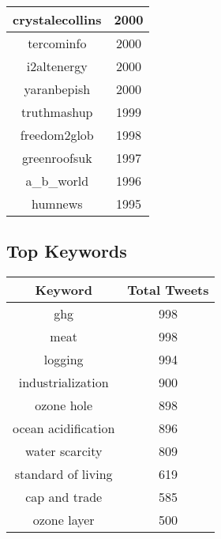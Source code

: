 \documentclass{article}\usepackage[T1]{fontenc}
\begin{document}
\begin{tabular}{|c|c|}
 \hline
crystalecollins & 2000\\ 
 \hline
tercominfo & 2000\\ 
 \hline
i2altenergy & 2000\\ 
 \hline
yaranbepish & 2000\\ 
 \hline
truthmashup & 1999\\ 
 \hline
freedom2glob & 1998\\ 
 \hline
greenroofsuk & 1997\\ 
 \hline
a\_b\_world & 1996\\ 
 \hline
humnews & 1995\\ 
 \hline
\end{tabular}\subsection*{Top Keywords}\begin{tabular}{|c|c|}         \hline         Keyword & Total Tweets \\ 
 \hline
ghg & 998\\ 
 \hline
meat & 998\\ 
 \hline
logging & 994\\ 
 \hline
industrialization & 900\\ 
 \hline
ozone hole & 898\\ 
 \hline
ocean acidification & 896\\ 
 \hline
water scarcity & 809\\ 
 \hline
standard of living & 619\\ 
 \hline
cap and trade & 585\\ 
 \hline
ozone layer & 500\\ 
 \hline
\end{tabular}
\end{document}
